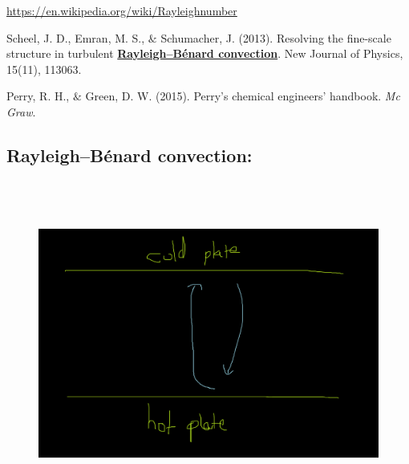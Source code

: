\documentclass[12pt]{article}
\renewcommand{\_}{\kern-1.5pt\textunderscore\kern-1.5pt}
\begin{document}
\begin{itemize}
\href{https://en.wikipedia.org/wiki/Rayleigh_number}{https://en.wikipedia.org/wiki/Rayleigh\_number}\par

Scheel, J. D., Emran, M. S., $\&$  Schumacher, J. (2013). Resolving the fine-scale structure in turbulent \textbf{\uline{Rayleigh–Bénard convection}}. New Journal of Physics, 15(11), 113063.\par

Perry, R. H., $\&$  Green, D. W. (2015). Perry’s chemical engineers’ handbook. \textit{Mc Graw}.\par


\vspace{\baselineskip}

\vspace{\baselineskip}
\subsection{Rayleigh–Bénard convection:}\par




\begin{figure}[H]
	\begin{Center}
		\includegraphics[width=6.26in,height=4.2in]{./media/image3.png}
	\end{Center}
\end{figure}




\end{itemize}
\end{document}

